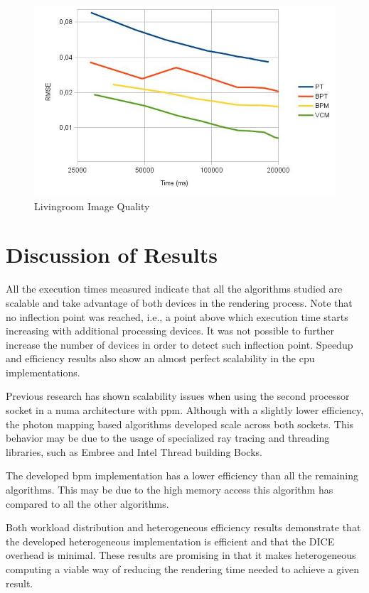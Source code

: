 \begin{figure}[H]
\centering
\includegraphics[width=0.8\linewidth]{img/livingroomImgq.jpg}
\caption{\label{img:livingroomImgq} Livingroom Image Quality}
\end{figure}

\section{Discussion of Results}

All the execution times measured indicate that all the algorithms studied are scalable and take advantage of both devices in the rendering process. Note that no inflection point was reached, i.e., a point above which execution time starts increasing with additional processing devices. It was not possible to further increase the number of devices in order to detect such inflection point. Speedup and efficiency results also show an almost perfect scalability in the \gls{cpu} implementations.

Previous research \citep{Palhas2013} has shown scalability issues when using the second processor socket in a \gls{numa} architecture with \gls{ppm}. Although with a slightly lower efficiency, the photon mapping based algorithms developed scale across both sockets. This behavior may be due to the usage of specialized ray tracing and threading libraries, such as Embree and Intel Thread building Bocks.

The developed \gls{bpm} implementation has a lower efficiency than all the remaining algorithms. This may be due to the high memory access this algorithm has compared to all the other algorithms.

Both workload distribution and heterogeneous efficiency results demonstrate that the developed heterogeneous implementation is efficient and that the DICE overhead is minimal. These results are promising in that it makes heterogeneous computing a viable way of reducing the rendering time needed to achieve a given result.

